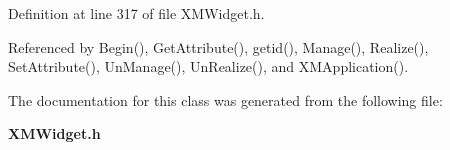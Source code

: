 Definition at line 317 of file XMWidget.h.

Referenced by Begin(), Get\-Attribute(), getid(), Manage(), Realize(), Set\-Attribute(), Un\-Manage(), Un\-Realize(), and XMApplication().

The documentation for this class was generated from the following file:\begin{CompactItemize}
\item 
{\bf XMWidget.h}\end{CompactItemize}
